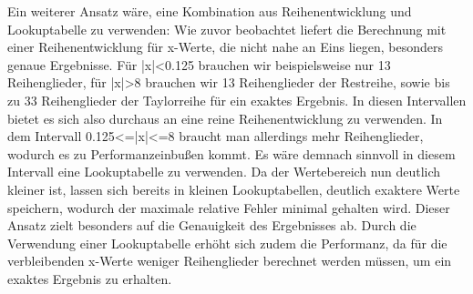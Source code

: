 \documentclass[course=erap] {aspdoc}
\begin{document}
     Ein weiterer Ansatz wäre, eine Kombination aus Reihenentwicklung und Lookuptabelle zu verwenden: 
    Wie zuvor beobachtet liefert die Berechnung mit einer Reihenentwicklung für x-Werte, die nicht nahe an Eins liegen, besonders genaue Ergebnisse. Für |x|<0.125 brauchen wir beispielsweise nur 13 Reihenglieder, für |x|>8 brauchen wir 13 Reihenglieder der Restreihe, sowie bis zu 33 Reihenglieder der Taylorreihe für ein exaktes Ergebnis. In diesen Intervallen bietet es sich also durchaus an eine reine Reihenentwicklung zu verwenden. In dem Intervall 0.125<=|x|<=8 braucht man allerdings mehr Reihenglieder, wodurch es zu Performanzeinbußen kommt. Es wäre demnach sinnvoll in diesem Intervall eine Lookuptabelle zu verwenden. Da der Wertebereich nun deutlich kleiner ist, lassen sich bereits in kleinen Lookuptabellen, deutlich exaktere Werte speichern, wodurch der maximale relative Fehler minimal gehalten wird. Dieser Ansatz zielt besonders auf die Genauigkeit des Ergebnisses ab. Durch die Verwendung einer Lookuptabelle erhöht sich zudem die Performanz, da für die verbleibenden x-Werte weniger Reihenglieder berechnet werden müssen, um ein exaktes Ergebnis zu erhalten. 



    
    
\end{document}
